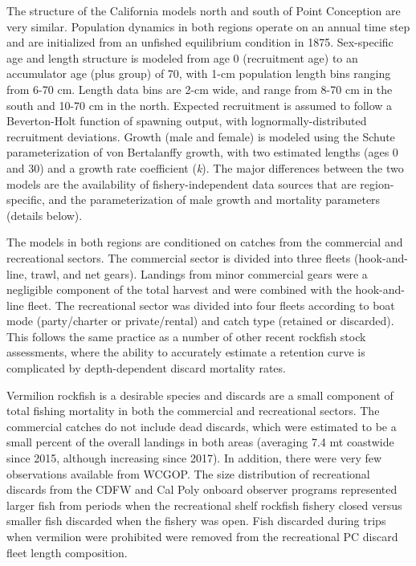 \documentclass[
  english,
  a4paper,
]{article}
\begin{document}
The structure of the California models north and south of Point Conception are very similar. Population dynamics in both regions operate on an annual time step and are initialized from an unfished equilibrium condition in 1875. Sex-specific age and length structure is modeled from age 0 (recruitment age) to an accumulator age (plus group) of 70, with 1-cm population length bins ranging from 6-70 cm. Length data bins are 2-cm wide, and range from 8-70 cm in the south and 10-70 cm in the north. Expected recruitment is assumed to follow a Beverton-Holt function of spawning output, with lognormally-distributed recruitment deviations. Growth (male and female) is modeled using the Schute parameterization of von Bertalanffy growth, with two estimated lengths (ages 0 and 30) and a growth rate coefficient (\emph{k}). The major differences between the two models are the availability of fishery-independent data sources that are region-specific, and the parameterization of male growth and mortality parameters (details below).

The models in both regions are conditioned on catches from the commercial and recreational sectors. The commercial sector is divided into three fleets (hook-and-line, trawl, and net gears). Landings from minor commercial gears were a negligible component of the total harvest and were combined with the hook-and-line fleet. The recreational sector was divided into four fleets according to boat mode (party/charter or private/rental) and catch type (retained or discarded). This follows the same practice as a number of other recent rockfish stock assessments, where the ability to accurately estimate a retention curve is complicated by depth-dependent discard mortality rates.

Vermilion rockfish is a desirable species and discards are a small component of total fishing mortality in both the commercial and recreational sectors. The commercial catches do not include dead discards, which were estimated to be a small percent of the overall landings in both areas (averaging 7.4 mt coastwide since 2015, although increasing since 2017). In addition, there were very few observations available from WCGOP. The size distribution of recreational discards from the CDFW and Cal Poly onboard observer programs represented larger fish from periods when the recreational shelf rockfish fishery closed versus smaller fish discarded when the fishery was open. Fish discarded during trips when vermilion were prohibited were removed from the recreational PC discard fleet length composition.
\end{document}
